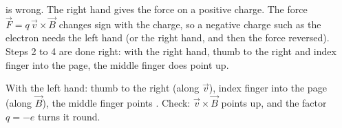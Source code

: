 \begin{abcliste}
\abc {} is wrong. The right hand gives the force on a positive charge. The force $\vec F = q\,\vec v\times\vec B$ changes sign with the charge, so a negative charge such as the electron needs the left hand (or the right hand, and then the force reversed). Steps 2 to 4 are done right: with the right hand, thumb to the right and index finger into the page, the middle finger does point up.

\abc With the left hand: thumb to the right (along $\vec v$), index finger into the page (along $\vec B$), the middle finger points . Check: $\vec v\times\vec B$ points up, and the factor $q = -e$ turns it round.
\end{abcliste}
